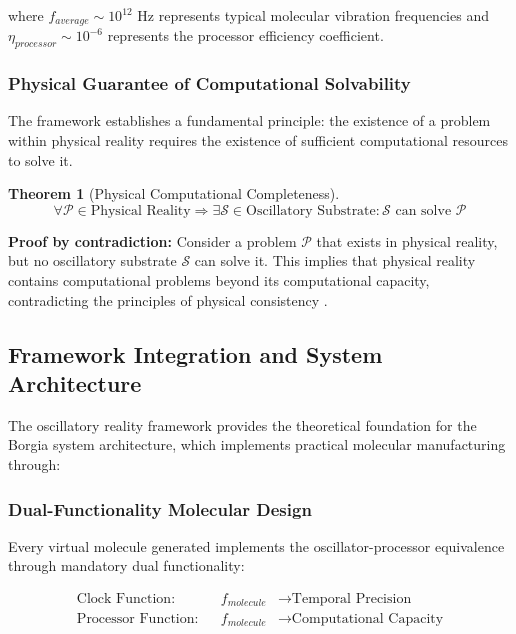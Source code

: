 \documentclass[12pt,a4paper]{article}
\newtheorem{theorem}{Theorem}
\begin{document}
where $f_{average} \sim 10^{12}$ Hz represents typical molecular vibration frequencies and $\eta_{processor} \sim 10^{-6}$ represents the processor efficiency coefficient.

\subsubsection{Physical Guarantee of Computational Solvability}

The framework establishes a fundamental principle: the existence of a problem within physical reality requires the existence of sufficient computational resources to solve it.

\begin{theorem}[Physical Computational Completeness]
\begin{equation}
\forall \mathcal{P} \in \text{Physical Reality} \Rightarrow \exists \mathcal{S} \in \text{Oscillatory Substrate} : \mathcal{S} \text{ can solve } \mathcal{P}
\end{equation}
\end{theorem}

\textbf{Proof by contradiction:} Consider a problem $\mathcal{P}$ that exists in physical reality, but no oscillatory substrate $\mathcal{S}$ can solve it. This implies that physical reality contains computational problems beyond its computational capacity, contradicting the principles of physical consistency \cite{lloyd2000ultimate,sterling2015principles}.

\subsection{Framework Integration and System Architecture}

The oscillatory reality framework provides the theoretical foundation for the Borgia system architecture, which implements practical molecular manufacturing through:

\subsubsection{Dual-Functionality Molecular Design}

Every virtual molecule generated implements the oscillator-processor equivalence through mandatory dual functionality:

\begin{align}
\text{Clock Function}: &&f_{molecule} &\rightarrow \text{Temporal Precision} \\
\text{Processor Function}: &&f_{molecule} &\rightarrow \text{Computational Capacity}
\end{align}
\end{document}
